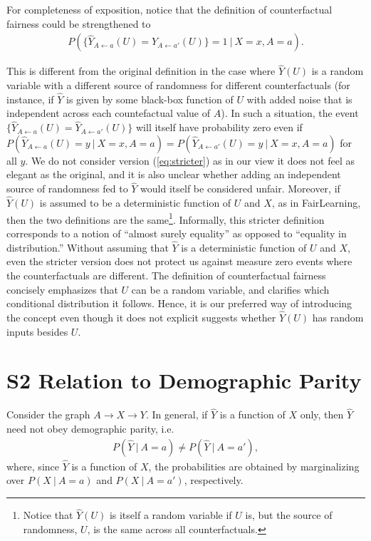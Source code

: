  For completeness of exposition,
notice that the definition of counterfactual fairness could be
strengthened to
\begin{align}
  \label{eq:stricter}
  P(\{\hat Y_{A \leftarrow a}(U) = \hat Y_{A \leftarrow a'}(U)\} = 1\ |\ X = x, A = a).
\end{align}

\noindent This is different from the original definition in the case
where $\hat Y(U)$ is a random variable with a different source of
randomness for different counterfactuals (for instance, if $\hat Y$ is
given by some black-box function of $U$ with added noise that is
independent across each countefactual value of $A$). In such a
situation, the event $\{\hat Y_{A \leftarrow a}(U) = \hat Y_{A
  \leftarrow a'}(U)\}$ will itself have probability zero even if
$P(\hat Y_{A \leftarrow a}(U) = y\ |\ X = x, A = a) = P(\hat Y_{A
  \leftarrow a'}(U) = y\ |\ X = x, A = a)$ for all $y$. We do not
consider version (\ref{eq:stricter}) as in our view it does not feel
as elegant as the original, and it is also unclear whether adding an
independent source of randomness fed to $\hat Y$ would itself be
considered unfair. Moreover, if $\hat Y(U)$ is assumed to be a
deterministic function of $U$ and $X$, as in {\sc FairLearning}, then
the two definitions are the same\footnote{Notice that $\hat Y(U)$ is
  itself a random variable if $U$ is, but the source of randomness,
  $U$, is the same across all counterfactuals.}. Informally, this
stricter definition corresponds to a notion of ``almost surely
equality'' as opposed to ``equality in distribution.'' Without
assuming that $\hat Y$ is a deterministic function of $U$ and $X$,
even the stricter version does not protect us against measure zero events
where the counterfactuals are different. The definition of
counterfactual fairness concisely emphasizes that $U$ can be a random
variable, and clarifies which conditional distribution it follows. Hence, it is our
preferred way of introducing the concept even though it does not
explicit suggests whether $\hat Y(U)$ has random inputs besides $U$.

\section*{S2 Relation to Demographic Parity}
%
Consider the graph $A \rightarrow X \rightarrow Y$. In general, if
$\hat Y$ is a function of $X$ only, then $\hat Y$ need not obey
demographic parity, i.e.
\begin{align}
  P(\hat Y\ |\ A = a) \neq P(\hat Y\ |\ A = a'),\nonumber
\end{align}
\noindent where, since $\hat Y$ is a function of $X$, the
probabilities are obtained by marginalizing over $P(X\ |\ A = a)$ and
$P(X\ |\ A = a')$, respectively.

